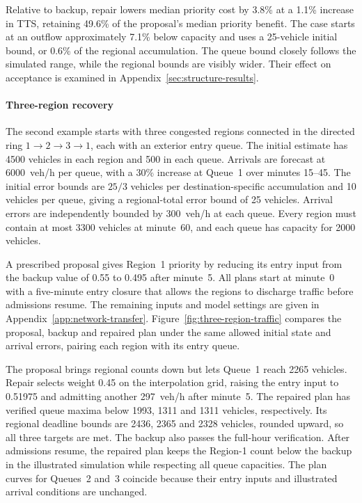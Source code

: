 \documentclass[final]{cas-sc}
\theoremstyle{definition}
\theoremstyle{plain}
\theoremstyle{definition}
\theoremstyle{plain}
\newcommand{\appref}[1]{Appendix~\ref{#1}}
\begin{document}
Relative to backup, repair lowers median priority cost by 3.8\% at a
1.1\% increase in TTS, retaining 49.6\% of the proposal's median
priority benefit. The case starts at an outflow approximately 7.1\%
below capacity and uses a 25-vehicle initial bound, or 0.6\% of the
regional accumulation. The queue bound closely follows the simulated
range, while the regional bounds are visibly wider. Their effect on
acceptance is examined in \appref{sec:structure-results}.

\paragraph{Three-region recovery}
\label{sec:multi-region-results}
The second example starts with three congested regions connected in
the directed ring $1\to2\to3\to1$, each with an exterior entry queue.
The initial estimate has 4500 vehicles in each region and 500 in
each queue. Arrivals are forecast at 6000~veh/h per queue,
with a 30\% increase at Queue~1 over minutes 15--45. The initial
error bounds are $25/3$ vehicles per destination-specific accumulation
and 10 vehicles per queue, giving a regional-total error bound of
25 vehicles. Arrival errors are independently bounded by 300~veh/h
at each queue. Every region must contain at most 3300 vehicles at
minute~60, and each queue has capacity for 2000 vehicles.

A prescribed proposal gives Region~1 priority by reducing its entry
input from the backup value of 0.55 to 0.495 after minute~5. All plans
start at minute~0 with a five-minute entry closure that allows the
regions to discharge traffic before admissions resume. The remaining
inputs and model settings are given in \appref{app:network-transfer}.
Figure~\ref{fig:three-region-traffic} compares the proposal, backup
and repaired plan under the same allowed initial state and arrival
errors, pairing each region with its entry queue.

The proposal brings regional counts down but lets Queue~1 reach
2265 vehicles. Repair selects weight 0.45 on the interpolation grid,
raising the entry input to 0.51975 and admitting another 297~veh/h
after minute~5. The repaired plan has verified queue maxima below
1993, 1311 and 1311 vehicles, respectively. Its regional deadline
bounds are 2436, 2365 and 2328 vehicles, rounded upward, so all three
targets are met. The backup also passes the full-hour verification.
After admissions resume, the repaired plan keeps the Region-1
count below the backup in the illustrated simulation while respecting
all queue capacities. The plan curves for Queues~2 and~3 coincide because
their entry inputs and illustrated arrival conditions are unchanged.
\end{document}
